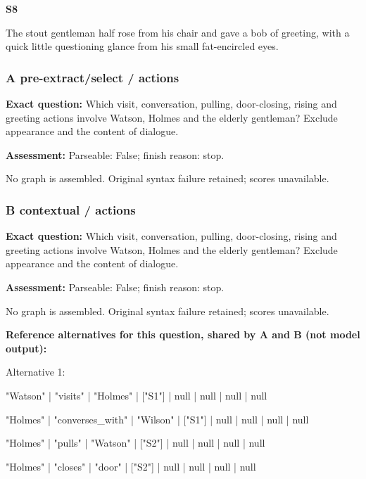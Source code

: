 \noindent\textbf{S8} 

The stout gentleman half rose from his chair and gave a bob of
greeting, with a quick little questioning glance from his small
fat-encircled eyes.\par\smallskip

\subsubsection*{A pre-extract/select / actions}

\noindent\textbf{Exact question:} Which visit, conversation, pulling, door-closing, rising and greeting actions involve Watson, Holmes and the elderly gentleman? Exclude appearance and the content of dialogue.\par

\noindent\textbf{Assessment:} Parseable: False; finish reason: stop.

\noindent No graph is assembled. Original syntax failure retained; scores unavailable.

\subsubsection*{B contextual / actions}

\noindent\textbf{Exact question:} Which visit, conversation, pulling, door-closing, rising and greeting actions involve Watson, Holmes and the elderly gentleman? Exclude appearance and the content of dialogue.\par

\noindent\textbf{Assessment:} Parseable: False; finish reason: stop.

\noindent No graph is assembled. Original syntax failure retained; scores unavailable.

\noindent\textbf{Reference alternatives for this question, shared by A and B (not model output):}

\noindent Alternative 1:

"Watson" | "visits" | "Holmes" | ["S1"] | null | null | null | null\par\smallskip

"Holmes" | "converses\_with" | "Wilson" | ["S1"] | null | null | null | null\par\smallskip

"Holmes" | "pulls" | "Watson" | ["S2"] | null | null | null | null\par\smallskip

"Holmes" | "closes" | "door" | ["S2"] | null | null | null | null\par\smallskip

